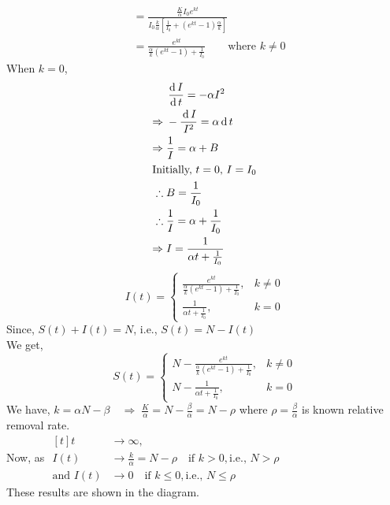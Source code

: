 \documentclass[../main-sheet.tex]{subfiles}
\begin{document}
\begin{soln}
\begin{align*}
        &=\frac{\frac{K}{\alpha}I_0 e^{kt}}{I_0\frac{k}{\alpha}\left[ \frac{1}{I_0}+\left( e^{kt}-1 \right)\frac{\alpha}{k} \right]}\\
        &=\frac{e^{kt}}{\frac{\alpha}{k}\left( e^{kt}-1 \right)+\frac{1}{I_0}}\qquad \text{where }k\neq0
    \end{align*}
    When \(k=0\), 
    \begin{align*}
        &\,\frac{\mathrm{d}\,I}{\mathrm{d}\,t}=-\alpha I^2\\
        \Rightarrow\;&-\frac{\,\mathrm{d}\, I}{I^2}=\alpha \,\mathrm{d}\, t\\
        \Rightarrow\;&\frac{1}{I}=\alpha +B\\
        \intertext{Initially, \(t=0\), \(I=I_0\)}
        \therefore\;&B=\frac{1}{I_0}\\
        \therefore\;&\frac{1}{I}=\alpha +\frac{1}{I_0}\\
        \Rightarrow\;&I=\frac{1}{\alpha t+\frac{1}{I_0}}
    \end{align*}
    \[
        I(t)=\begin{cases}
        \frac{e^{kt}}{\frac{\alpha}{k}\left( e^{kt}-1 \right)+\frac{1}{I_0}},&k\neq 0\\
        \frac{1}{\alpha t+\frac{1}{I_0}},&k=0
        \end{cases}
    \]
    Since, \(S(t)+I(t)=N\), i.e., \(S(t)=N-I(t)\)\\
    We get,
    \[
        S(t)=\begin{cases}
        N-\frac{e^{kt}}{\frac{\alpha}{k}\left( e^{kt}-1 \right)+\frac{1}{I_0}},&k\neq 0\\
        N-\frac{1}{\alpha t+\frac{1}{I_0}},&k=0
        \end{cases}
    \]
    We have, \(k=\alpha N-\beta\quad\Rightarrow\;\frac{K}{\alpha}=N-\frac{\beta}{\alpha}=N-\rho\) where \(\rho=\frac{\beta}{\alpha}\) is known relative removal rate.\\
    Now, as \(\begin{aligned}[t]
        t&\to \infty,\\
        I(t)&\to \frac{k}{\alpha}=N-\rho\quad \text{if }k>0, \text{i.e., }N>\rho\\
        \text{and }I(t)&\to 0\quad \text{if }k\leq 0, \text{i.e., }N\leq\rho
    \end{aligned}\)\\

    These results are shown in the diagram.
    \begin{center}
\end{center}
\end{soln}
\end{document}

